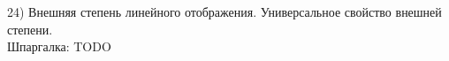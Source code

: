 24) Внешняя степень линейного отображения. Универсальное свойство внешней степени.\\
Шпаргалка: TODO\\
